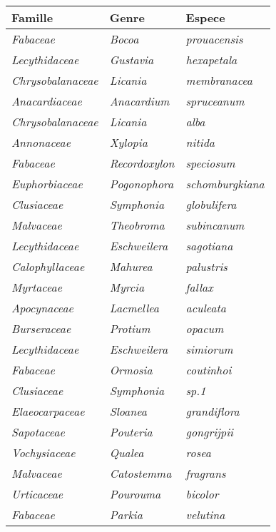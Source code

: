 \documentclass[fleqn,10pt]{ArtEcoFoG} %
\renewenvironment{table}{\begin{table*}}{\end{table*}\ignorespacesafterend}
\begin{document}
\begin{table}

\caption{\label{tab:Splist}Table S1: Table of pearson correlation coefficients among functional traits.}
\begin{tabular}[t]{lll}
\toprule
\textbf{Famille} & \textbf{Genre} & \textbf{Espece}\\
\midrule
\em{Fabaceae} & \em{Bocoa} & \em{prouacensis}\\
\em{Lecythidaceae} & \em{Gustavia} & \em{hexapetala}\\
\em{Chrysobalanaceae} & \em{Licania} & \em{membranacea}\\
\em{Anacardiaceae} & \em{Anacardium} & \em{spruceanum}\\
\em{Chrysobalanaceae} & \em{Licania} & \em{alba}\\
\addlinespace
\em{Annonaceae} & \em{Xylopia} & \em{nitida}\\
\em{Fabaceae} & \em{Recordoxylon} & \em{speciosum}\\
\em{Euphorbiaceae} & \em{Pogonophora} & \em{schomburgkiana}\\
\em{Clusiaceae} & \em{Symphonia} & \em{globulifera}\\
\em{Malvaceae} & \em{Theobroma} & \em{subincanum}\\
\addlinespace
\em{Lecythidaceae} & \em{Eschweilera} & \em{sagotiana}\\
\em{Calophyllaceae} & \em{Mahurea} & \em{palustris}\\
\em{Myrtaceae} & \em{Myrcia} & \em{fallax}\\
\em{Apocynaceae} & \em{Lacmellea} & \em{aculeata}\\
\em{Burseraceae} & \em{Protium} & \em{opacum}\\
\addlinespace
\em{Lecythidaceae} & \em{Eschweilera} & \em{simiorum}\\
\em{Fabaceae} & \em{Ormosia} & \em{coutinhoi}\\
\em{Clusiaceae} & \em{Symphonia} & \em{sp.1}\\
\em{Elaeocarpaceae} & \em{Sloanea} & \em{grandiflora}\\
\em{Sapotaceae} & \em{Pouteria} & \em{gongrijpii}\\
\addlinespace
\em{Vochysiaceae} & \em{Qualea} & \em{rosea}\\
\em{Malvaceae} & \em{Catostemma} & \em{fragrans}\\
\em{Urticaceae} & \em{Pourouma} & \em{bicolor}\\
\em{Fabaceae} & \em{Parkia} & \em{velutina}\\

\end{tabular}
\end{table}
\end{document}
